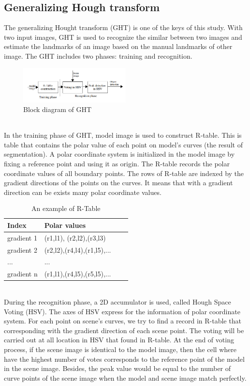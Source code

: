 \documentclass[twoside,twocolumn,10pt]{article}
\begin{document}
\subsection{Generalizing Hough transform}
The generalizing Hought transform (GHT)\cite{Ballard} is one of the
keys of this study. With two input images, GHT is used to recognize
the similar between two images and estimate the landmarks of an image
based on the manual landmarks of other image. The GHT includes two
phases: training and recognition.\\[0.2cm]

\begin{figure}[htb]
    \centering
    \includegraphics[width=0.5\textwidth]{./images/ghtdiagram}
    \caption{Block diagram of GHT}
    \label{fig:box}
\end{figure}~\\
In the training phase of GHT, model image is used to construct
R-table. This is table that contains the polar value of each point on
model's curves (the result of segmentation). A polar coordinate system
is initialized in the model image by fixing a reference point and
using it as origin. The R-table records the polar coordinate values of
all boundary points. The rows of R-table are indexed by the gradient
directions of the points on the curves. It means that with a gradient
direction can be exists many polar coordinate values.

\begin{table}[htb]
	\centering
	\begin{tabular}{|l|l|l|l|}
	\hline
	Index & Polar values \\
	\hline
	gradient 1 & (r1,l1), (r2,l2),(r3,l3) \\
	\hline
	gradient 2 & (r2,l2),(r4,l4),(r1,l5),... \\
	\hline
	... & ...\\
	\hline
	gradient n & (r1,l1),(r4,l5),(r5,l5),... \\
	\hline
	\end{tabular}
	\caption{An example of R-Table}
\end{table}\\
During the recognition phase, a 2D accumulator is used, called Hough
Space Voting (HSV). The axes of HSV express for the information of
polar coordinate system. For each point on scene's curves, we try to
find a record in R-table that corresponding with the gradient
direction of each scene point. The voting will be carried out at all
location in HSV that found in R-table. At the end of voting process,
if the scene image is identical to the model image, then the cell
where have the highest number of votes corresponds to the reference
point of the model in the scene image. Besides, the peak value would
be equal to the number of curve points of the scene image when the
model and scene image match perfectly.
\end{document}
